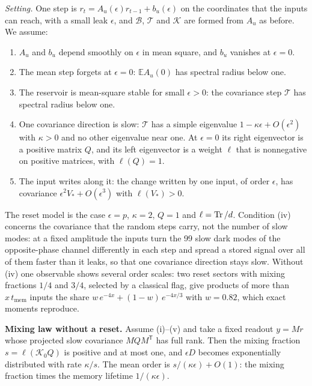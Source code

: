 \emph{Setting.} One step is $r_t=A_u(\epsilon)r_{t-1}+b_u(\epsilon)$ on the coordinates that the inputs can reach,
with a small leak $\epsilon$, and $\mathcal B$, $\mathcal T$ and $\mathcal K$ are formed from $A_u$ as before. We
assume:
\begin{enumerate}[label=(\roman*),leftmargin=*,itemsep=2pt,topsep=4pt]
\item $A_u$ and $b_u$ depend smoothly on $\epsilon$ in mean square, and $b_u$ vanishes at $\epsilon=0$.
\item The mean step forgets at $\epsilon=0$: $\mathbb EA_u(0)$ has spectral radius below one.
\item The reservoir is mean-square stable for small $\epsilon>0$: the covariance step $\mathcal T$ has spectral radius
  below one.
\item One covariance direction is slow: $\mathcal T$ has a simple eigenvalue $1-\kappa\epsilon+O(\epsilon^2)$ with
  $\kappa>0$ and no other eigenvalue near one. At $\epsilon=0$ its right eigenvector is a positive matrix $Q$, and its
  left eigenvector is a weight $\ell$ that is nonnegative on positive matrices, with $\ell(Q)=1$.
\item The input writes along it: the change written by one input, of order $\epsilon$, has covariance
  $\epsilon^2V_*+O(\epsilon^3)$ with $\ell(V_*)>0$.
\end{enumerate}
The reset model is the case $\epsilon=p$, $\kappa=2$, $Q=1$ and $\ell=\operatorname{Tr}/d$. Condition (iv) concerns the
covariance that the random steps carry, not the number of slow modes: at a fixed amplitude the inputs turn the 99
slow dark modes of the opposite-phase channel differently in each step and spread a stored signal over all of them
faster than it leaks, so that one covariance direction stays slow. Without (iv) one observable shows several order
scales: two reset sectors with mixing fractions $1/4$ and $3/4$, selected by a classical flag, give products of more
than $x\,t_{\mathrm{mem}}$ inputs the share $w\,e^{-4x}+(1-w)\,e^{-4x/3}$ with $w=0.82$, which exact moments
reproduce.

\begin{keybox}
\textbf{Mixing law without a reset.} Assume (i)--(v) and take a fixed readout $y=Mr$ whose projected slow
covariance $MQM^{\mathsf T}$ has full rank. Then the mixing fraction $s=\ell(\mathcal K_0Q)$ is positive and at most one, and $\epsilon D$ becomes exponentially distributed with rate $\kappa/s$. The mean order is
$s/(\kappa\epsilon)+O(1)$: the mixing fraction times the memory lifetime $1/(\kappa\epsilon)$.
\end{keybox}

